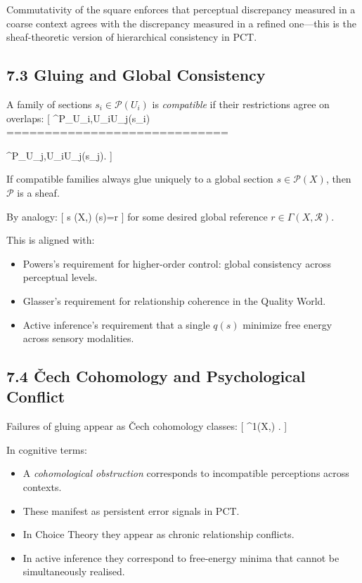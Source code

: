 \documentclass[11pt,a4paper,twoside]{article}
\begin{document}
Commutativity of the square enforces that perceptual discrepancy measured in a coarse context agrees with the discrepancy measured in a refined one---this is the sheaf-theoretic version of hierarchical consistency in PCT.

\subsection{7.3 Gluing and Global Consistency}

A family of sections ${s_i\in\mathcal{P}(U_i)}$ is \emph{compatible} if their restrictions agree on overlaps:
[
\rho^P_{U_i,U_i\cap U_j}(s_i)
=============================

\rho^P_{U_j,U_i\cap U_j}(s_j).
]

If compatible families always glue uniquely to a global section $s\in\mathcal{P}(X)$, then $\mathcal{P}$ is a sheaf.

By analogy:
[
\iff
\exists s \in \Gamma(X,)  \Phi(s)=r
]
for some desired global reference $r \in \Gamma(X,\mathcal{R})$.

This is aligned with:
\begin{itemize}
\item Powers’s requirement for higher-order control: global consistency across perceptual levels.
\item Glasser’s requirement for relationship coherence in the Quality World.
\item Active inference's requirement that a single $q(s)$ minimize free energy across sensory modalities.
\end{itemize}

\subsection{7.4 \v{C}ech Cohomology and Psychological Conflict}

Failures of gluing appear as \v{C}ech cohomology classes:
[
^1(X,) .
]

In cognitive terms:

\begin{itemize}
\item A \emph{cohomological obstruction} corresponds to incompatible perceptions across contexts.
\item These manifest as persistent error signals in PCT.
\item In Choice Theory they appear as chronic relationship conflicts.
\item In active inference they correspond to free-energy minima that cannot be simultaneously realised.
\end{itemize}
\end{document}
